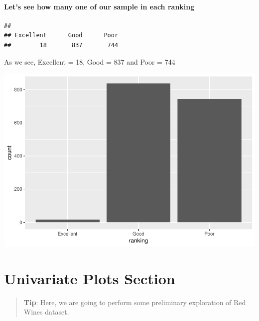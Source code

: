 \documentclass[]{article}
\let\oldparagraph\paragraph
\renewcommand{\paragraph}[1]{\oldparagraph{#1}\mbox{}}
\begin{document}
\paragraph{Let's see how many one of our sample in each
ranking}\label{lets-see-how-many-one-of-our-sample-in-each-ranking}

\begin{verbatim}
## 
## Excellent      Good      Poor 
##        18       837       744
\end{verbatim}

As we see, Excellent = 18, Good = 837 and Poor = 744

\includegraphics{RedWine_files/figure-latex/Disiplay_QPlot_Ranking-1.pdf}

\section{Univariate Plots Section}\label{univariate-plots-section}

\begin{quote}
\textbf{Tip}: Here, we are going to perform some preliminary exploration
of Red Wines dataset.
\end{quote}
\end{document}
